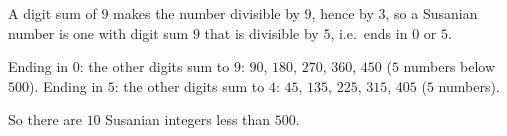 A digit sum of $9$ makes the number divisible by $9$, hence by $3$, so a Susanian number is one with digit sum $9$ that is divisible by $5$, i.e.\ ends in $0$ or $5$.

Ending in $0$: the other digits sum to $9$: $90$, $180$, $270$, $360$, $450$ ($5$ numbers below $500$).
Ending in $5$: the other digits sum to $4$: $45$, $135$, $225$, $315$, $405$ ($5$ numbers).

So there are $\boxed{10}$ Susanian integers less than $500$.
